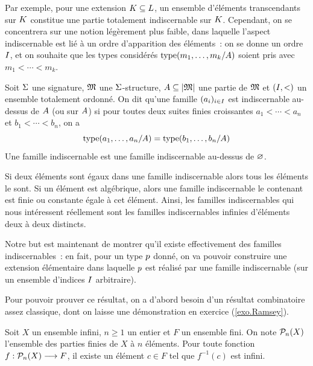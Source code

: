 Par exemple, pour une extension $K\subseteq L$, un ensemble d'éléments
transcendants sur $K$ constitue une partie totalement indiscernable sur
$K$. Cependant, on se concentrera sur une notion légèrement plus faible,
dans laquelle l'aspect indiscernable est lié à un ordre d'apparition des
éléments~: on se donne un ordre $I$, et on souhaite que les types
considérés $\operatorname{type}(m_1,\ldots,m_k/A)$ soient pris avec $m_1 < \cdots < m_k$.

\begin{definition}
  Soit $\Sigma$ une signature, $\mathfrak{M}$ une $\Sigma$-structure,
  $A\subseteq\left\vert \mathfrak{M}\right\vert$ une partie de $\mathfrak{M}$ et $(I,<)$ un ensemble
  totalement ordonné. On dit qu'une famille $(a_i)_{i \in I}$ est
  indiscernable au-dessus de $A$ (ou sur $A$) si pour toutes deux
  suites finies croissantes $a_1 < \cdots < a_n$ et $b_1 < \cdots < b_n$, on a
  \[\operatorname{type}(a_1,\ldots,a_n/A) = \operatorname{type}(b_1,\ldots,b_n/A)\]
  Une famille indiscernable est une famille indiscernable au-dessus de $\varnothing$.
\end{definition}

\begin{remark}
  Si deux éléments sont égaux dans une famille indiscernable alors tous les
  éléments le sont. Si un élément est algébrique, alors une famille
  indiscernable le contenant est finie ou constante égale à cet élément.
  Ainsi, les familles indiscernables qui nous intéressent réellement sont les
  familles indiscernables infinies d'éléments deux à deux distincts.
\end{remark}

Notre but est maintenant de montrer qu'il existe effectivement des familles
indiscernables~: en fait, pour un type $p$ donné, on va pouvoir
construire une extension élémentaire dans laquelle $p$ est réalisé par
une famille indiscernable (sur un ensemble d'indices $I$ arbitraire).

Pour pouvoir prouver ce résultat, on a d'abord besoin d'un résultat combinatoire
assez classique, dont on laisse une démonstration en exercice
(\cref{exo.Ramsey}).

\begin{theorem}\label{thm.ramsey.infini}
  Soit $X$ un ensemble infini, $n \geq 1$ un entier et $F$ un ensemble fini.
  On note $\mathcal{P}_n(X)$ l'ensemble des parties finies de $X$ à $n$ éléments.
  Pour toute fonction $f : \displaystyle \mathcal{P}_n(X) \longrightarrow F$, il existe un
  élément $c \in F$ tel que $f^{-1}({c})$ est infini.
\end{theorem}

